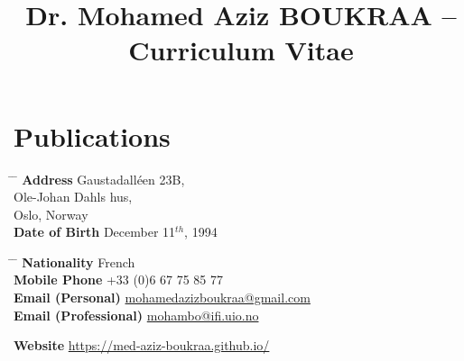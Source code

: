 \documentclass[10pt]{article} %
\begin{document}
\section*{Publications}


\title{Dr. Mohamed Aziz BOUKRAA -- Curriculum Vitae} %





\parbox{0.5\textwidth}{ %
\begin{tabbing} %
\hspace{2.5cm} \= \hspace{4cm} \= \kill %
{\bf Address} \> Gaustadalléen 23B,\\ %
\> Ole-Johan Dahls hus,\\
 Oslo, Norway \\ %
{\bf Date of Birth} \>  December 11$^{th}$, 1994 \\%
\end{tabbing}}
\hspace{0.5cm}
\parbox{0.5\textwidth}{ %
\begin{tabbing} %
\hspace{3.5cm} \= \hspace{4cm} \= \kill %
{\bf Nationality} \> French \\%
{\bf Mobile Phone} \> +33 (0)6 67 75 85 77 \\ %
{\bf Email (Personal)} \> \href{mailto:mohamedazizboukraa@gmail.com}{mohamedazizboukraa@gmail.com} \\ %
{\bf Email (Professional)} \> \href{mailto:mohambo@ifi.uio.no}{mohambo@ifi.uio.no} \\ %
\end{tabbing}}

\vspace{-0.7cm}
{\bf Website}  \href{https://med-aziz-boukraa.github.io/}{https://med-aziz-boukraa.github.io/} \\ %
\end{document}
